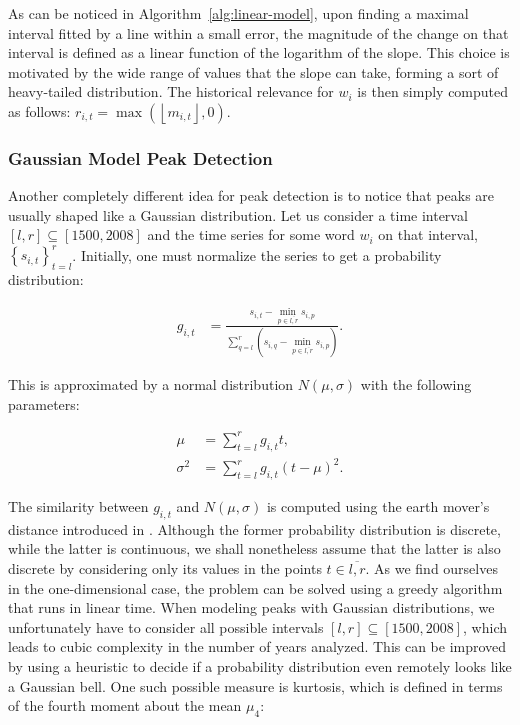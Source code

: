 As can be noticed in Algorithm~\ref{alg:linear-model}, upon finding a maximal interval fitted by a line within a small error, the magnitude of the change on that interval is defined as a linear function of the logarithm of the slope. This choice is motivated by the wide range of values that the slope can take, forming a sort of heavy-tailed distribution. The historical relevance for $w_i$ is then simply computed as follows: $r_{i, t} = \max \left( \left\lfloor m_{i, t} \right\rfloor, 0 \right)$.

\subsubsection{Gaussian Model Peak Detection}

Another completely different idea for peak detection is to notice that peaks are usually shaped like a Gaussian distribution. Let us consider a time interval $\left[ l, r \right] \subseteq \left[ 1500, 2008 \right]$ and the time series for some word $w_i$ on that interval, $\left\{ s_{i, t} \right\}_{t=l}^{r}$. Initially, one must normalize the series to get a probability distribution:

\begin{align}
\label{eq:gaussian-normalization}
g_{i, t} &= \frac{s_{i, t} - \min_{p \in \overline{l, r}} s_{i, p}}{\sum_{q = l}^{r} \left( s_{i, q} - \min_{p \in \overline{l, r}} s_{i, p} \right)}.
\end{align}

This is approximated by a normal distribution $N \left( \mu, \sigma \right)$ with the following parameters:

\begin{align}
\label{eq:mu-gaussian-model}
\mu &= \sum_{t=l}^{r} g_{i, t} t, \\
\label{eq:sigma-gaussian-model}
\sigma^2 &= \sum_{t=l}^{r} g_{i, t} \left( t - \mu \right)^2.
\end{align}

The similarity between $g_{i, t}$ and $N \left( \mu, \sigma \right)$ is computed using the earth mover's distance introduced in . Although the former probability distribution is discrete, while the latter is continuous, we shall nonetheless assume that the latter is also discrete by considering only its values in the points $t \in \overline{l, r}$. As we find ourselves in the one-dimensional case, the problem can be solved using a greedy algorithm that runs in linear time. When modeling peaks with Gaussian distributions, we unfortunately have to consider all possible intervals $\left[ l, r \right] \subseteq \left[ 1500, 2008 \right]$, which leads to cubic complexity in the number of years analyzed. This can be improved by using a heuristic to decide if a probability distribution even remotely looks like a Gaussian bell. One such possible measure is kurtosis, which is defined in terms of the fourth moment about the mean $\mu_4$:

